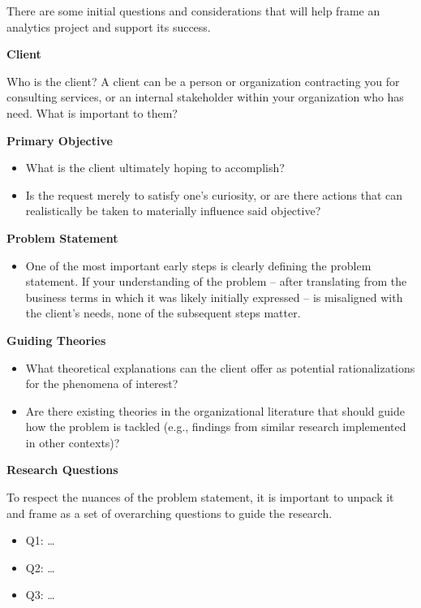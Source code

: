 \documentclass[]{book}
\providecommand{\tightlist}{%
  \setlength{\itemsep}{0pt}\setlength{\parskip}{0pt}}
\begin{document}
There are some initial questions and considerations that will help frame an analytics project and support its success.

\textbf{Client}

Who is the client? A client can be a person or organization contracting you for consulting services, or an internal stakeholder within your organization who has need. What is important to them?

\textbf{Primary Objective}

\begin{itemize}
\tightlist
\item
  What is the client ultimately hoping to accomplish?
\item
  Is the request merely to satisfy one's curiosity, or are there actions that can realistically be taken to materially influence said objective?
\end{itemize}

\textbf{Problem Statement}

\begin{itemize}
\tightlist
\item
  One of the most important early steps is clearly defining the problem statement. If your understanding of the problem -- after translating from the business terms in which it was likely initially expressed -- is misaligned with the client's needs, none of the subsequent steps matter.
\end{itemize}

\textbf{Guiding Theories}

\begin{itemize}
\tightlist
\item
  What theoretical explanations can the client offer as potential rationalizations for the phenomena of interest?
\item
  Are there existing theories in the organizational literature that should guide how the problem is tackled (e.g., findings from similar research implemented in other contexts)?
\end{itemize}

\textbf{Research Questions}

To respect the nuances of the problem statement, it is important to unpack it and frame as a set of overarching questions to guide the research.

\begin{itemize}
\tightlist
\item
  Q1: \ldots{}
\item
  Q2: \ldots{}
\item
  Q3: \ldots{}
\end{itemize}
\end{document}
